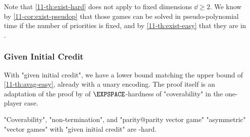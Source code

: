 Note that \cref{11-th:exist-hard} does not apply to fixed dimensions
$\dd\geq 2$.  We know by \cref{11-cor:exist-pseudop} that those games can
be solved in pseudo-polynomial time if the number of priorities is
fixed, and by \cref{11-th:exist-easy} that they are in \coNP.

\subsubsection{Given Initial Credit}
With "given initial credit", we have a lower bound matching the
\kEXP[2] upper bound of \cref{11-th:avag-easy}, already with a unary
encoding.  The proof itself is an adaptation of the proof by
 of $\EXPSPACE$-hardness of "coverability" in
the one-player case.

\begin{theorem}
\label{11-th:avag-hard}
  "Coverability", "non-termination", and "parity@parity vector game"
  "asymmetric" "vector games" with "given initial credit" are
  \kEXP[2]-hard.
\end{theorem}
